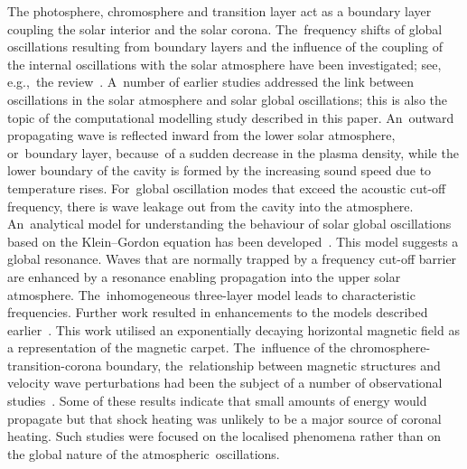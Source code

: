 \documentclass[physics,article,accept,pdftex,moreauthors]{Definitions/mdpi}
\begin{document}
 The photosphere, chromosphere and transition layer act as a boundary layer coupling the solar interior and the solar corona. The~frequency shifts of global oscillations resulting  from boundary layers   and the influence of the coupling of the internal oscillations with the solar atmosphere have been investigated; see, e.g.,~the review~\cite{Erdelyi2006}.  A~number of earlier studies addressed the link between oscillations in the solar atmosphere and solar global oscillations;  this is also the topic of the computational modelling 
 {study} 
described in this paper. An~outward propagating wave is reflected inward from the lower solar atmosphere, or~boundary layer, because~of a sudden decrease in the plasma density, while the lower boundary of the cavity is formed by the increasing sound speed due to temperature rises. For~global oscillation modes that exceed the acoustic cut-off frequency, there is wave leakage out from the cavity into the atmosphere. An~analytical model for understanding the behaviour of solar global oscillations based on the Klein--Gordon equation has been  developed~\cite{Taroyan2008}. This model suggests a global resonance. Waves  that are normally trapped by a frequency cut-off barrier are enhanced by a resonance enabling propagation into the upper solar atmosphere. The~inhomogeneous three-layer model leads to characteristic frequencies. Further work resulted in enhancements to the models described earlier~\cite{Pinter2007}.  This work utilised an exponentially decaying horizontal magnetic field as a representation of the magnetic carpet.  The~influence of the chromosphere-transition-corona boundary, the~relationship between magnetic structures and velocity wave perturbations had been the subject of a number of observational studies~\cite{Mein1976,Schmieder1980}. Some of these results indicate that small amounts of energy would propagate but that shock heating was unlikely to be a major source of coronal heating. Such studies were focused on the localised phenomena rather than on the global nature of the atmospheric~oscillations.
 
\end{document}
